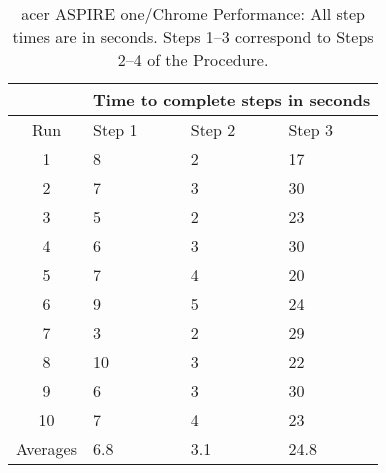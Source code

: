 \begin{table}
  \begin{center}
  \begin{tabularx}{275pt}{| c | X | X | X |}
    \hline
                 & \multicolumn{3}{c|}{Time to complete steps in seconds} \\ \hline
    Run          & Step 1 & Step 2 & Step 3 \\ \hline
    1            & 8      & 2      & 17     \\ \hline
    2            & 7      & 3      & 30     \\ \hline
    3            & 5      & 2      & 23     \\ \hline
    4            & 6      & 3      & 30     \\ \hline
    5            & 7      & 4      & 20     \\ \hline
    6            & 9      & 5      & 24     \\ \hline
    7            & 3      & 2      & 29     \\ \hline
    8            & 10     & 3      & 22     \\ \hline
    9            & 6      & 3      & 30     \\ \hline
    10           & 7      & 4      & 23     \\ \hline
    Averages     & 6.8    & 3.1    & 24.8   \\
    \hline
  \end{tabularx}
  \caption{acer ASPIRE one/Chrome Performance:  All step times are in seconds.  Steps 1--3 correspond to Steps 2--4 of the Procedure.}
  \label{aspChrPerf}
  \end{center}
\end{table}
